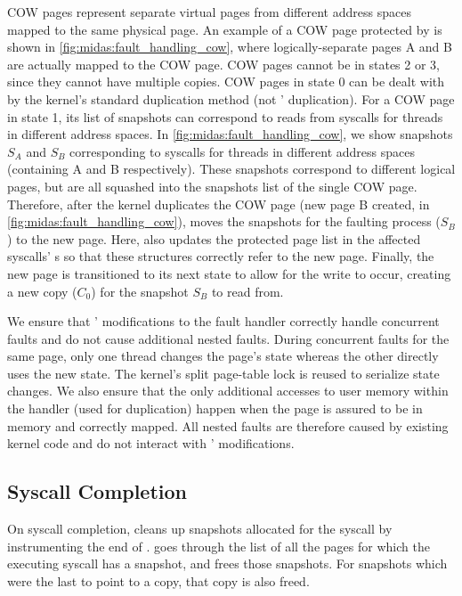 COW pages represent separate virtual pages from different
address spaces mapped to the same physical page.
An example of a COW page protected by \midas is shown in
\autoref{fig:midas:fault_handling_cow}, where logically-separate pages A and B
are actually mapped to the COW page.
COW pages cannot be in states 2 or 3, since they cannot have multiple
\midas copies.
COW pages in state 0 can be dealt with by the kernel's standard
duplication method (not \midas' duplication).
For a COW page in state 1, its list of snapshots can correspond to
reads from syscalls for threads in different address spaces.
In \autoref{fig:midas:fault_handling_cow}, we show snapshots $S_A$ and
$S_B$ corresponding to syscalls for threads in different address
spaces (containing A and B respectively).
These snapshots correspond to different logical pages, but are
all squashed into the snapshots list of the single COW page.
Therefore, after the kernel duplicates the COW page (new page
B created, in \autoref{fig:midas:fault_handling_cow}), \midas moves
the snapshots for the faulting process ($S_B$) to the new page.
Here, \midas also updates the protected page list in the
affected syscalls' s so that these structures
correctly refer to the new page.
Finally, the new page is transitioned to its next state to allow
for the write to occur, creating a new copy ($C_0$) for the
snapshot $S_B$ to read from.

We ensure that \midas' modifications to the fault handler
correctly handle concurrent faults and do not cause additional
nested faults.
During concurrent faults for the same page, only one thread
changes the page's state whereas the other directly uses the new
state.
The kernel's split page-table lock is reused to serialize state
changes.
We also ensure that the only additional accesses to user memory
within the handler (used for duplication) happen when the page
is assured to be in memory and correctly mapped.
All nested faults are therefore caused by existing kernel code
and do not interact with \midas' modifications.

\subsection{Syscall Completion}

On syscall completion, \midas cleans up snapshots allocated for
the syscall by instrumenting the end of .
\midas goes through the list of all the pages for which the
executing syscall has a snapshot, and frees those snapshots.
For snapshots which were the last to point to a copy, that
copy is also freed.


